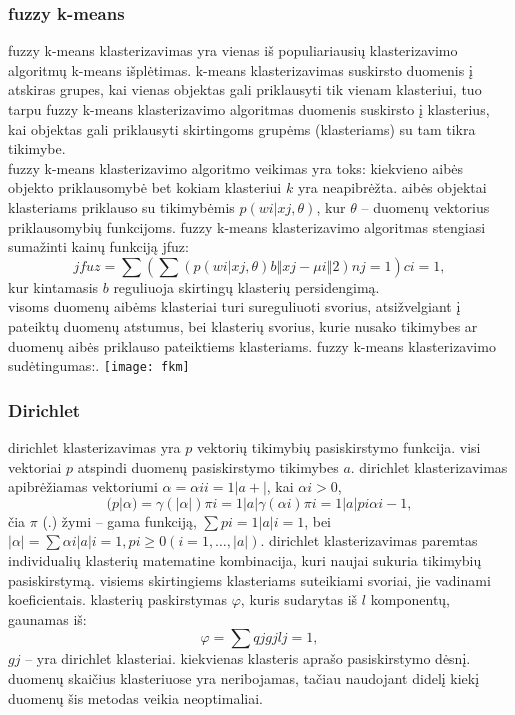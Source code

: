 \documentclass{VUMIFInfKursinis}
\begin{document}
		\subsubsection{fuzzy k-means}
			fuzzy k-means klasterizavimas yra vienas iš populiariausių klasterizavimo algoritmų k-means išplėtimas. k-means klasterizavimas suskirsto duomenis į atskiras grupes, kai vienas objektas gali priklausyti tik vienam klasteriui, tuo tarpu fuzzy k-means klasterizavimo algoritmas duomenis suskirsto į klasterius, kai objektas gali priklausyti skirtingoms grupėms (klasteriams) su tam tikra tikimybe.\\
			fuzzy k-means klasterizavimo algoritmo veikimas yra toks: kiekvieno aibės objekto priklausomybė bet kokiam klasteriui $k$ yra neapibrėžta. aibės objektai klasteriams priklauso su tikimybėmis $p(wi | xj, \theta)$, kur $\theta$ – duomenų vektorius priklausomybių funkcijoms. fuzzy k-means klasterizavimo algoritmas stengiasi sumažinti kainų funkciją jfuz:
			\begin{equation}
				jfuz=\sum{(\sum{(p(wi|xj,\theta)b‖xj−μi‖2)}nj=1)}ci = 1,
			\end{equation}
			kur kintamasis $b$ reguliuoja skirtingų klasterių persidengimą.\\
			visoms duomenų aibėms klasteriai turi sureguliuoti svorius, atsižvelgiant į pateiktų duomenų atstumus, bei klasterių svorius, kurie nusako tikimybes ar duomenų aibės priklauso pateiktiems klasteriams. fuzzy k-means klasterizavimo sudėtingumas:.
			\texttt{[image: fkm]}

		\subsubsection{Dirichlet}
			dirichlet klasterizavimas yra $p$ vektorių tikimybių pasiskirstymo funkcija. visi vektoriai $p$ atspindi duomenų pasiskirstymo tikimybes $a$. dirichlet klasterizavimas apibrėžiamas vektoriumi $ \alpha = {\alpha i}i=1|a+|$, kai $ \alpha i > 0$,\\
			\begin{equation}
				(p|\alpha)=\gamma(|\alpha|)\pi i=1|a|\gamma (\alpha i)\pi i=1|a|pi \alpha i−1,
			\end{equation}
			čia $\pi$ (.) žymi – gama funkciją, $\sum{pi=1|a|i=1}$, bei $|\alpha| = \sum{\alpha i|a|i=1,pi≥0} (i =1,\ldots,|a|)$.
			dirichlet klasterizavimas paremtas individualių klasterių matematine kombinacija, kuri naujai sukuria tikimybių pasiskirstymą. visiems skirtingiems klasteriams suteikiami svoriai, jie vadinami koeficientais. klasterių paskirstymas $\varphi$, kuris sudarytas iš $l$ komponentų, gaunamas iš:
			\begin{equation}
				\varphi = \sum{qjgjlj=1},
			\end{equation}
			$gj$ – yra dirichlet klasteriai. kiekvienas klasteris aprašo pasiskirstymo dėsnį. duomenų skaičius klasteriuose yra neribojamas, tačiau naudojant didelį kiekį duomenų šis metodas veikia neoptimaliai.
\end{document}
